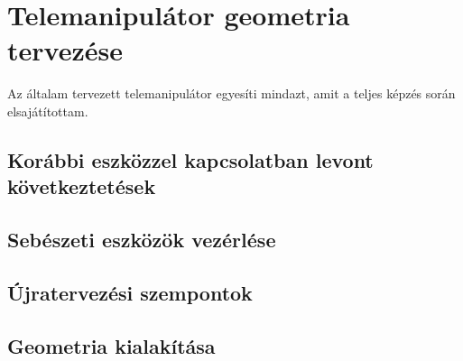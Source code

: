 \chapter{Telemanipulátor geometria tervezése}
\label{sec:LatexTools}

Az általam tervezett telemanipulátor egyesíti mindazt, amit a teljes képzés során elsajátítottam. 

\section{Korábbi eszközzel kapcsolatban levont következtetések}
\section{Sebészeti eszközök vezérlése}
\section{Újratervezési szempontok}
\section{Geometria kialakítása}
